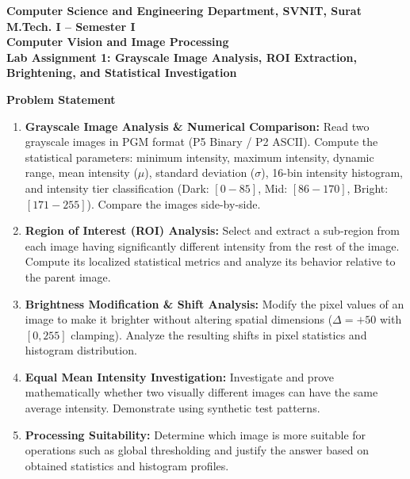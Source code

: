 \documentclass[12pt]{article}
\begin{document}
\begin{center}
\textbf{Computer Science and Engineering Department, SVNIT, Surat}\\
\textbf{M.Tech. I -- Semester I}\\
\textbf{Computer Vision and Image Processing}\\
\textbf{Lab Assignment 1: Grayscale Image Analysis, ROI Extraction, Brightening, and Statistical Investigation}
\end{center}

\vspace{0.4cm}

\textbf{Problem Statement}

\begin{enumerate}
    \item \textbf{Grayscale Image Analysis \& Numerical Comparison:} Read two grayscale images in PGM format (P5 Binary / P2 ASCII). Compute the statistical parameters: minimum intensity, maximum intensity, dynamic range, mean intensity ($\mu$), standard deviation ($\sigma$), 16-bin intensity histogram, and intensity tier classification (Dark: $[0-85]$, Mid: $[86-170]$, Bright: $[171-255]$). Compare the images side-by-side.
    \item \textbf{Region of Interest (ROI) Analysis:} Select and extract a sub-region from each image having significantly different intensity from the rest of the image. Compute its localized statistical metrics and analyze its behavior relative to the parent image.
    \item \textbf{Brightness Modification \& Shift Analysis:} Modify the pixel values of an image to make it brighter without altering spatial dimensions ($\Delta = +50$ with $[0, 255]$ clamping). Analyze the resulting shifts in pixel statistics and histogram distribution.
    \item \textbf{Equal Mean Intensity Investigation:} Investigate and prove mathematically whether two visually different images can have the same average intensity. Demonstrate using synthetic test patterns.
    \item \textbf{Processing Suitability:} Determine which image is more suitable for operations such as global thresholding and justify the answer based on obtained statistics and histogram profiles.
\end{enumerate}

\vspace{0.3cm}
\newpage
\end{document}
